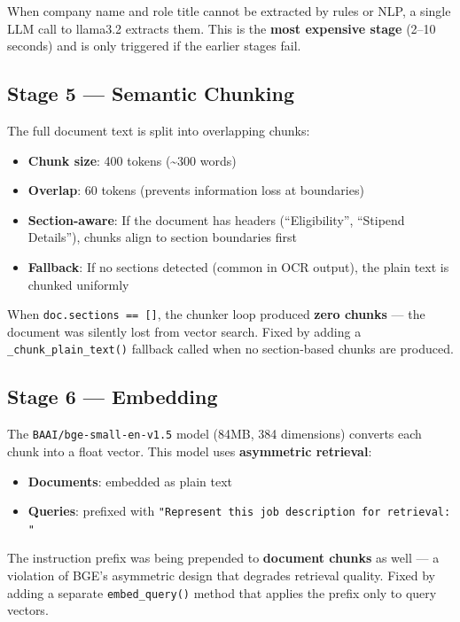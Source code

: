 \documentclass[12pt, a4paper]{article}
\begin{document}
When company name and role title cannot be extracted by rules or NLP, a single LLM call to llama3.2 extracts them. This is the \textbf{most expensive stage} (2--10 seconds) and is only triggered if the earlier stages fail.

\subsection{Stage 5 --- Semantic Chunking}

The full document text is split into overlapping chunks:

\begin{itemize}[noitemsep]
    \item \textbf{Chunk size}: 400 tokens (\textasciitilde 300 words)
    \item \textbf{Overlap}: 60 tokens (prevents information loss at boundaries)
    \item \textbf{Section-aware}: If the document has headers (``Eligibility'', ``Stipend Details''), chunks align to section boundaries first
    \item \textbf{Fallback}: If no sections detected (common in OCR output), the plain text is chunked uniformly
\end{itemize}

\begin{bugbox}
When \texttt{doc.sections == []}, the chunker loop produced \textbf{zero chunks} --- the document was silently lost from vector search. Fixed by adding a \texttt{\_chunk\_plain\_text()} fallback called when no section-based chunks are produced.
\end{bugbox}

\subsection{Stage 6 --- Embedding}

The \texttt{BAAI/bge-small-en-v1.5} model (84MB, 384 dimensions) converts each chunk into a float vector. This model uses \textbf{asymmetric retrieval}:

\begin{itemize}[noitemsep]
    \item \textbf{Documents}: embedded as plain text
    \item \textbf{Queries}: prefixed with \texttt{"Represent this job description for retrieval: "}
\end{itemize}

\begin{bugbox}
The instruction prefix was being prepended to \textbf{document chunks} as well --- a violation of BGE's asymmetric design that degrades retrieval quality. Fixed by adding a separate \texttt{embed\_query()} method that applies the prefix only to query vectors.
\end{bugbox}
\end{document}
